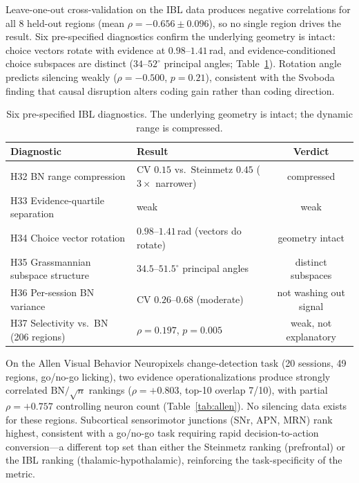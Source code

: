 \documentclass[9pt,lineno]{elife}
\begin{document}
Leave-one-out cross-validation on the IBL data produces negative correlations for all 8 held-out regions (mean $\rho = -0.656 \pm 0.096$), so no single region drives the result. Six pre-specified diagnostics confirm the underlying geometry is intact: choice vectors rotate with evidence at $0.98$--$1.41$\,rad, and evidence-conditioned choice subspaces are distinct ($34$--$52^\circ$ principal angles; Table~\ref{tab:ibl}). Rotation angle predicts silencing weakly ($\rho = -0.500$, $p = 0.21$), consistent with the Svoboda finding that causal disruption alters coding gain rather than coding direction.

\begin{table}[t]
\centering
\caption{Six pre-specified IBL diagnostics. The underlying geometry is intact; the dynamic range is compressed.}
\label{tab:ibl}
\begin{tabular}{llc}
\toprule
Diagnostic & Result & Verdict \\
\midrule
H32 BN range compression & CV $0.15$ vs.\ Steinmetz $0.45$ ($3\times$ narrower) & compressed \\
H33 Evidence-quartile separation & weak & weak \\
H34 Choice vector rotation & $0.98$--$1.41$\,rad (vectors do rotate) & geometry intact \\
H35 Grassmannian subspace structure & $34.5$--$51.5^\circ$ principal angles & distinct subspaces \\
H36 Per-session BN variance & CV $0.26$--$0.68$ (moderate) & not washing out signal \\
H37 Selectivity vs.\ BN (206 regions) & $\rho = 0.197$, $p = 0.005$ & weak, not explanatory \\
\bottomrule
\end{tabular}
\end{table}

On the Allen Visual Behavior Neuropixels change-detection task (20 sessions, 49 regions, go/no-go licking), two evidence operationalizations produce strongly correlated $\text{BN}/\!\sqrt{n}$ rankings ($\rho = +0.803$, top-10 overlap 7/10), with partial $\rho = +0.757$ controlling neuron count (Table~\ref{tab:allen}). No silencing data exists for these regions. Subcortical sensorimotor junctions (SNr, APN, MRN) rank highest, consistent with a go/no-go task requiring rapid decision-to-action conversion---a different top set than either the Steinmetz ranking (prefrontal) or the IBL ranking (thalamic-hypothalamic), reinforcing the task-specificity of the metric.
\end{document}

